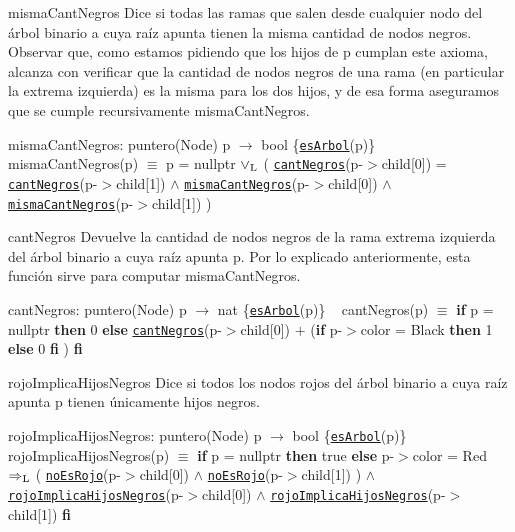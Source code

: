 \begin{DoxyParagraph}{misma\+Cant\+Negros}
Dice si todas las ramas que salen desde cualquier nodo del árbol binario a cuya raíz apunta tienen la misma cantidad de nodos negros. Observar que, como estamos pidiendo que los hijos de p cumplan este axioma, alcanza con verificar que la cantidad de nodos negros de una rama (en particular la extrema izquierda) es la misma para los dos hijos, y de esa forma aseguramos que se cumple recursivamente misma\+Cant\+Negros.

misma\+Cant\+Negros\+: puntero(\+Node) p $\to$ bool \{\href{axiomas.html#esArbol}{\tt es\+Arbol}(p)\} ~\newline
 misma\+Cant\+Negros(p) $\equiv$ p = nullptr $\lor_{\rm L}$ ( \href{axiomas.html#cantNegros}{\tt cant\+Negros}(p-\/$>$child\mbox{[}0\mbox{]}) = \href{axiomas.html#cantNegros}{\tt cant\+Negros}(p-\/$>$child\mbox{[}1\mbox{]}) $\land$ \href{axiomas.html#mismaCantNegros}{\tt misma\+Cant\+Negros}(p-\/$>$child\mbox{[}0\mbox{]}) $\land$ \href{axiomas.html#mismaCantNegros}{\tt misma\+Cant\+Negros}(p-\/$>$child\mbox{[}1\mbox{]}) )


\end{DoxyParagraph}
\begin{DoxyParagraph}{cant\+Negros}
Devuelve la cantidad de nodos negros de la rama extrema izquierda del árbol binario a cuya raíz apunta p. Por lo explicado anteriormente, esta función sirve para computar misma\+Cant\+Negros.

cant\+Negros\+: puntero(\+Node) p $\to$ nat \{\href{axiomas.html#esArbol}{\tt es\+Arbol}(p)\} ~\newline
 cant\+Negros(p) $\equiv$ {\bfseries if} p = nullptr {\bfseries then} 0 {\bfseries else} \href{axiomas.html#cantNegros}{\tt cant\+Negros}(p-\/$>$child\mbox{[}0\mbox{]}) $+$ ({\bfseries if} p-\/$>$color = Black {\bfseries then} 1 {\bfseries else} 0 {\bfseries fi} ) {\bfseries fi} 


\end{DoxyParagraph}
\begin{DoxyParagraph}{rojo\+Implica\+Hijos\+Negros}
Dice si todos los nodos rojos del árbol binario a cuya raíz apunta p tienen únicamente hijos negros.

rojo\+Implica\+Hijos\+Negros\+: puntero(\+Node) p $\to$ bool \{\href{axiomas.html#esArbol}{\tt es\+Arbol}(p)\} ~\newline
 rojo\+Implica\+Hijos\+Negros(p) $\equiv$ {\bfseries if} p = nullptr {\bfseries then} true {\bfseries else} p-\/$>$color = Red $\Rightarrow_{\rm L}$ ( \href{axiomas.html#noEsRojo}{\tt no\+Es\+Rojo}(p-\/$>$child\mbox{[}0\mbox{]}) $\land$ \href{axiomas.html#noEsRojo}{\tt no\+Es\+Rojo}(p-\/$>$child\mbox{[}1\mbox{]}) ) $\land$ \href{axiomas.html#rojoImplicaHijosNegros}{\tt rojo\+Implica\+Hijos\+Negros}(p-\/$>$child\mbox{[}0\mbox{]}) $\land$ \href{axiomas.html#rojoImplicaHijosNegros}{\tt rojo\+Implica\+Hijos\+Negros}(p-\/$>$child\mbox{[}1\mbox{]}) {\bfseries fi} 


\end{DoxyParagraph}
